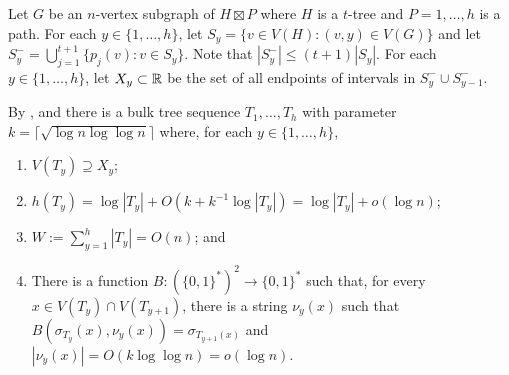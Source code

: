 \documentclass[kpfonts]{patmorin}
\let\le\leqslant
\begin{document}
Let $G$ be an $n$-vertex subgraph of $H\boxtimes P$ where $H$ is a $t$-tree and $P=1,\ldots,h$ is a path. For each $y\in\{1,\ldots,h\}$, let $S_y=\{v\in V(H): (v,y)\in V(G)\}$ and let $S^-_y=\bigcup_{j=1}^{t+1}\{p_j(v):v\in S_y\}$.  Note that $|S^-_y|\le (t+1)|S_y|$. For each $y\in\{1,\ldots,h\}$, let $X_y\subset\mathbb{R}$ be the set of all endpoints of intervals in $S^-_y\cup S^-_{y-1}$.

By ,  and   there is a bulk tree sequence $T_1,\ldots,T_h$ with parameter $k=\lceil \sqrt{\log n \log \log n}\rceil$ where, for each $y\in\{1,\ldots,h\}$, 
\begin{enumerate}[(PR1)]
  \item $V(T_y)\supseteq X_y$;
  \item $h(T_y)= \log |T_y| + O(k+k^{-1}\log |T_y|)= \log |T_y| + o(\log n)$;
  \item $W:=\sum_{y=1}^h |T_y|= O(n)$; and
  \item There is a function $B:(\{0,1\}^*)^2\to\{0,1\}^*$ such that, for every $x\in V(T_y)\cap V(T_{y+1})$, there is a string $\nu_y(x)$ such that $B(\sigma_{T_y}(x),\nu_y(x))=\sigma_{T_{y+1}(x)}$ and $|\nu_y(x)|=O(k\log\log n)=o(\log n)$.
\end{enumerate}

% 
% 
% 
% 
\end{document}
